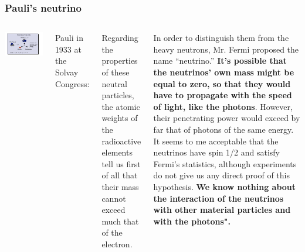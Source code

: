 \begin{frame}
\frametitle{Pauli's neutrino}
\begin{columns}
\includegraphics[scale=0.3]{img/pauli-neutrino.png}

\noindent Pauli in  1933 at the Solvay Congress: 

Regarding the properties of these neutral particles, the atomic weights
of the radioactive elements tell us first of all that their mass cannot exceed
much that of the electron.

 In order to distinguish them from the heavy
neutrons, Mr. Fermi proposed the name ``neutrino.'' {\bf It's possible that the
neutrinos' own mass might be equal to zero, so that they would have to
propagate with the speed of light, like the photons}. However, their penetrating power would exceed by far that of photons of the same energy. It
seems to me acceptable that the neutrinos have spin 1/2 and satisfy Fermi's 
statistics, although experiments do not give us any direct proof of this hypothesis. 
{\bf We know nothing about the interaction of the neutrinos with other material particles and with the photons".}
\end{columns}
\end{frame}

% 

